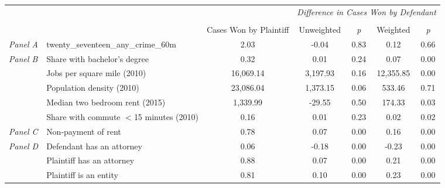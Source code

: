 \begin{tabular}{llccccc}
\toprule
 &  & \textit{} & \multicolumn{4}{c}{\textit{Difference in Cases Won by Defendant}} \\
\cline{4-7}
\\
 &  & Cases Won by Plaintiff & Unweighted & \emph{p} & Weighted & \emph{p} \\
\midrule
\textit{Panel A} & twenty_seventeen_any_crime_60m & 2.03 & -0.04 & 0.83 & 0.12 & 0.66 \\
\cline{1-7}
\multirow[c]{5}{3cm}{\textit{Panel B}} & Share with bachelor's degree & 0.32 & 0.01 & 0.24 & 0.07 & 0.00 \\
 & Jobs per square mile (2010) & 16,069.14 & 3,197.93 & 0.16 & 12,355.85 & 0.00 \\
 & Population density (2010) & 23,086.04 & 1,373.15 & 0.06 & 533.46 & 0.71 \\
 & Median two bedroom rent (2015) & 1,339.99 & -29.55 & 0.50 & 174.33 & 0.03 \\
 & Share with commute $<$15 minutes (2010) & 0.16 & 0.01 & 0.23 & 0.02 & 0.02 \\
\cline{1-7}
\textit{Panel C} & Non-payment of rent & 0.78 & 0.07 & 0.00 & 0.16 & 0.00 \\
\cline{1-7}
\multirow[c]{3}{3cm}{\textit{Panel D}} & Defendant has an attorney & 0.06 & -0.18 & 0.00 & -0.23 & 0.00 \\
 & Plaintiff has an attorney & 0.88 & 0.07 & 0.00 & 0.21 & 0.00 \\
 & Plaintiff is an entity & 0.81 & 0.10 & 0.00 & 0.23 & 0.00 \\
\cline{1-7}
\bottomrule
\end{tabular}
